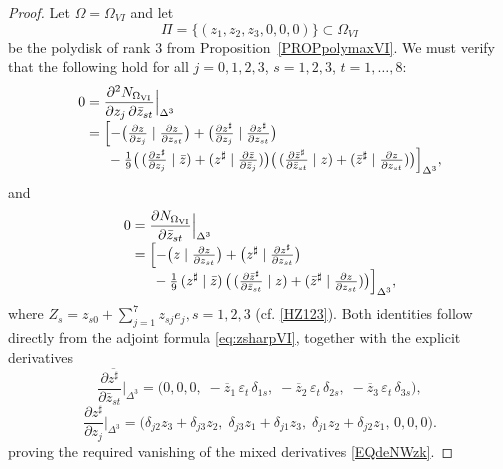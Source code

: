 \documentclass[reqno, 11pt]{amsart}
\begin{document}
\begin{proof}
Let $\Omega=\Omega_{VI}$ and let
\[
\Pi=\{(z_1,z_2,z_3,0, 0,0)\}\subset\Omega_{VI}
\]
be the polydisk of rank $3$ from Proposition~\ref{PROPpolymaxVI}.  We must verify that  the following hold for all \(j=0,1,2,3\), \(s=1,2,3\), \(t=1,\dots,8\):  
\begin{equation}\label{EQde2NWVI_revised}
\begin{aligned}
0
&=\frac{\partial^2 N_{\Omega_{\mathrm{VI}}}}{\partial z_j\,\partial\bar z_{st}}
\Big\vert_{\Delta^3} \\[-0.3em]
&=\Bigl[
  -\bigl(\tfrac{\partial z}{\partial z_j}\mid\tfrac{\partial z}{\partial z_{st}}\bigr)
  +\bigl(\tfrac{\partial z^\sharp}{\partial z_j}\mid\tfrac{\partial{z}^\sharp}{\partial z_{st}}\bigr) \\[-0.3em]
&\quad\;\;
  -\tfrac19\bigl(\,( \tfrac{\partial z^\sharp}{\partial z_j}\mid\bar z)
        + (z^\sharp\mid\tfrac{\partial\bar z}{\partial\bar z_j})\bigr)
    \bigl(\,( \tfrac{\partial\bar{z}^\sharp}{\partial\bar z_{st}}\mid  z)
        +(\bar z^\sharp\mid\tfrac{\partial z}{\partial z_{st}})\bigr)
\Bigr]_{\Delta^3},
\end{aligned}
\end{equation}
and
\begin{equation}\label{EQdeNWVI_revised}
\begin{aligned}
0
&=\frac{\partial N_{\Omega_{\mathrm{VI}}}}{\partial\bar z_{st}}
\Big\vert_{\Delta^3} \\[-0.3em]
&=\Bigl[
  -\bigl(z\mid\tfrac{\partial z}{\partial z_{st}}\bigr)
  +\bigl(z^\sharp\mid\tfrac{\partial{z}^\sharp}{\partial z_{st}}\bigr) \\[-0.3em]
&\quad\;\;
  -\tfrac19\,(z^\sharp\mid\bar z)\,
    \bigl(\,( \tfrac{\partial\bar{z}^\sharp}{\partial\bar z_{st}}\mid z)
        +(\bar z^\sharp\mid\tfrac{\partial z}{\partial z_{st}})\bigr)
\Bigr]_{\Delta^3}, 
\end{aligned}
\end{equation}
where
$Z_s=z_{s0}+\sum_{j=1}^{7}z_{sj} e_j, s=1, 2, 3$ (cf. \eqref{HZ123}).
 Both identities follow directly from the adjoint formula \eqref{eq:zsharpVI},
together with the explicit derivatives
\begin{equation}\label{EQdebst_revised}
\frac{\partial\overline{z^\sharp}}{\partial\bar z_{st}}\Big\vert_{\Delta^3}
=\bigl(0,0,0,\; -\overline{z}_1\,\varepsilon_t\,\delta_{1s},\; -\overline{z}_2\,\varepsilon_t\,\delta_{2s},\; -\overline{z}_3\,\varepsilon_t\,\delta_{3s}\bigr),
\end{equation}
\begin{equation}\label{EQdej_revised}
\frac{\partial z^\sharp}{\partial z_j}\Big\vert_{\Delta^3}
=\bigl(\delta_{j2}z_3+\delta_{j3}z_2,\;\delta_{j3}z_1+\delta_{j1}z_3,\;\delta_{j1}z_2+\delta_{j2}z_1,\,0,0,0\bigr).
\end{equation}
proving the required vanishing of the mixed derivatives
\eqref{EQdeNWzk}.


\end{proof}
\end{document}
